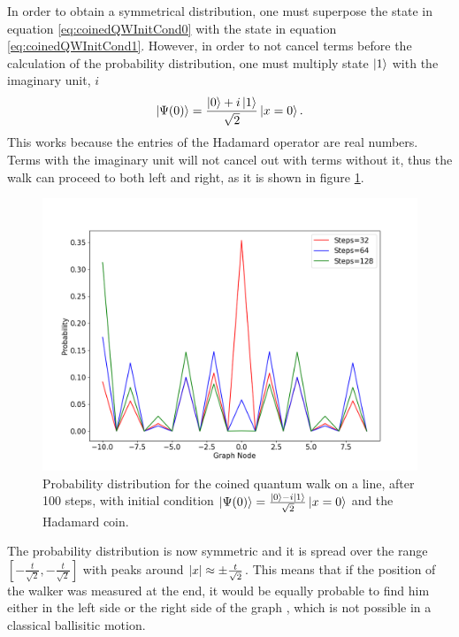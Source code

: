 \documentclass[../../dissertation.tex]{subfiles}
\begin{document}
In order to obtain a symmetrical distribution, one must superpose the state in equation \ref{eq:coinedQWInitCond0} with the state in equation \ref{eq:coinedQWInitCond1}. However, in order to not cancel terms before the calculation of the probability distribution, one must multiply state $\ket{1}$ with the imaginary unit, $i$ 
\begin{equation}
	\ket{\Psi(0)} = \frac{\ket{0}+i\ket{1}}{\sqrt{2}}\ket{x=0}.
	\label{eq:12}
\end{equation}
This works because the entries of the Hadamard operator are real numbers. Terms with the imaginary unit will not cancel out with terms without it, thus the walk can proceed to both left and right, as it is shown in figure \ref{fig:coinedQWDist01}. 
\begin{figure}[!ht]
	\centering
	\includegraphics[scale=0.40]{img/CoinedQuantumWalk/CoinedMultiple_psi01_3264128}
	\caption{Probability distribution for the coined quantum walk on a line, after 100 steps, with initial condition $\ket{\Psi(0)}=\frac{\ket{0}-i\ket{1}}{\sqrt{2}}\ket{x=0}$ and the Hadamard coin.} 
	\label{fig:coinedQWDist01}
\end{figure}\par
The probability distribution is now symmetric and it is spread over the range $[-\frac{t}{\sqrt{2}},-\frac{t}{\sqrt{2}}]$ with peaks around $\abs{x} \approx \pm \frac{t}{\sqrt{2}}$. This means that if the position of the walker was measured at the end, it would be equally probable to find him either in the left side or the right side of the graph , which is not possible in a classical ballisitic motion.\par
\end{document}
